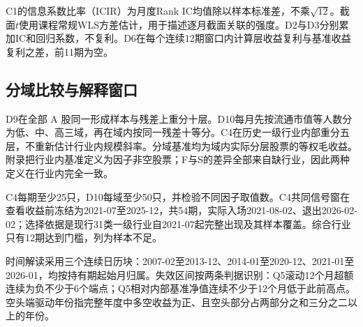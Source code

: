 C1的信息系数比率（ICIR）为月度Rank IC均值除以样本标准差，不乘$\sqrt{12}$。截面$t$使用课程常规WLS方差估计，用于描述逐月截面关联的强度。D2与D3分别累加IC和回归系数，不复利。D6在每个连续12期窗口内计算层收益复利与基准收益复利之差，前11期为空。

\subsection{分域比较与解释窗口}
D9在全部 A 股同一形成样本与残差上重分十层。D10每月先按流通市值等人数分为低、中、高三域，再在域内按同一残差十等分。C4在历史一级行业内部重分五层，不重新估计行业内规模斜率。分域基准均为域内实际分层股票的等权毛收益。附录把行业内基准定义为因子非空股票；F与S的差异全部来自缺行业，因此两种定义在行业内完全一致。

C4每期至少25只，D10每域至少50只，并检验不同因子取值数。C4共同信号窗在查看收益前冻结为2021-07至2025-12，共54期，实际入场2021-08-02、退出2026-02-02；选择依据是现行31类一级行业自2021-07起完整出现及其样本覆盖。综合行业只有12期达到门槛，列为样本不足。

时间解读采用三个连续日历块：2007-02至2013-12、2014-01至2020-12、2021-01至2026-01，均按持有期起始月归属。失效区间按两条判据识别：Q5滚动12个月超额连续为负不少于6个端点；Q5相对内部基准净值连续不少于12个月低于此前高点。空头端驱动年份指完整年度中多空收益为正、且空头部分占两部分之和三分之二以上的年份。
